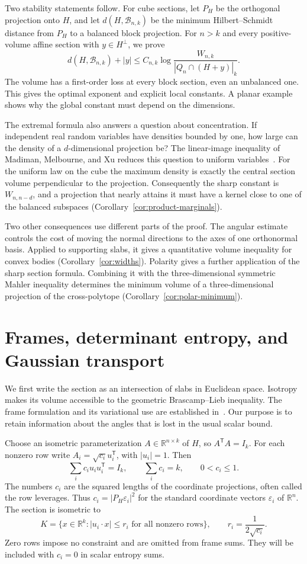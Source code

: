 \documentclass[11pt,a4paper]{article}
\theoremstyle{remark}\newtheorem{remark}[theorem]{Remark}
\numberwithin{equation}{section}
\begin{document}
Two stability statements follow. For cube sections, let \(P_H\) be
the orthogonal projection onto \(H\), and let \(d(H,\mathcal B_{n,k})\)
be the minimum Hilbert--Schmidt distance from \(P_H\) to a balanced
block projection. For \(n>k\) and every positive-volume affine section
with \(y\in H^\perp\), we prove
\[
 d(H,\mathcal B_{n,k})+|y|
 \le C_{n,k}\log\frac{W_{n,k}}{|Q_n\cap(H+y)|_k}.
\]
The volume has a first-order loss at every block section, even an
unbalanced one. This gives the optimal exponent and explicit local
constants. A planar example shows why the global constant must depend
on the dimensions.

The extremal formula also answers a question about concentration.
If independent real random variables have densities bounded by one,
how large can the density of a \(d\)-dimensional projection be?
The linear-image inequality of Madiman, Melbourne, and Xu reduces
this question to uniform variables~\cite{MMX2017}. For the uniform
law on the cube the maximum density is exactly the central section
volume perpendicular to the projection. Consequently the sharp
constant is \(W_{n,n-d}\), and a projection that nearly attains it must
have a kernel close to one of the balanced subspaces
(Corollary~\ref{cor:product-marginals}).

Two other consequences use different parts of the proof.
The angular estimate controls the cost of moving the normal directions
to the axes of one orthonormal basis. Applied to supporting slabs,
it gives a quantitative volume inequality for convex bodies
(Corollary~\ref{cor:widths}). Polarity gives a further application of
the sharp section formula. Combining it with the three-dimensional
symmetric Mahler inequality determines the minimum volume of a
three-dimensional projection of the cross-polytope
(Corollary~\ref{cor:polar-minimum}).

\section{Frames, determinant entropy, and Gaussian transport}
\label{sec:frames}

We first write the section as an intersection of slabs in Euclidean
space. Isotropy makes its volume accessible to the geometric
Brascamp--Lieb inequality. The frame formulation and its variational
use are established in~\cite{Ivanov2021Frames,IvanovTsiutsiurupa2021}. Our purpose is to
retain information about the angles that is lost in the usual scalar
bound.

Choose an isometric parameterization $A\in\mathbb R^{n\times k}$
of $H$, so $A^{\mathsf T}A=I_k$. For each nonzero row write
$A_i=\sqrt{c_i}u_i^{\mathsf T}$, with $|u_i|=1$. Then
\[
 \sum_i c_i u_i u_i^{\mathsf T}=I_k,
 \qquad \sum_i c_i=k,
 \qquad 0<c_i\le1.
\]
The numbers $c_i$ are the squared lengths of the coordinate projections,
often called the row leverages. Thus $c_i=|P_H\varepsilon_i|^2$ for the standard coordinate vectors
$\varepsilon_i$ of $\mathbb R^n$. The section is isometric to
\[
 K=\{x\in\mathbb R^k:|u_i\cdot x|\le r_i\text{ for all nonzero rows}\},
 \qquad r_i=\frac1{2\sqrt{c_i}}.
\]
Zero rows impose no constraint and are omitted from frame sums. They
will be included with $c_i=0$ in scalar entropy sums.
\end{document}

